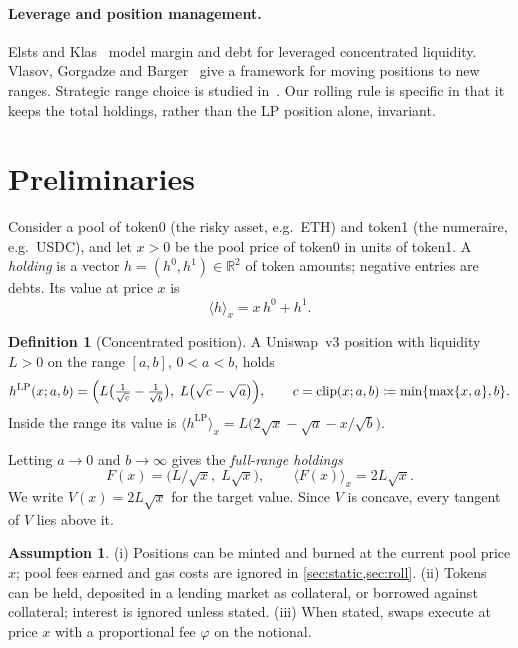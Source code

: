 \documentclass[11pt]{article}
\theoremstyle{definition}
\newtheorem{definition}{Definition}
\newtheorem{assumption}{Assumption}
\theoremstyle{remark}
\newcommand{\clip}{\operatorname{clip}}
\newcommand{\val}[2]{\langle #1\rangle_{#2}}
\newcommand{\hLP}{h^{\mathrm{LP}}}
\begin{document}
\paragraph{Leverage and position management.}
Elsts and Klas~\cite{elsts2024leverage} model margin and debt for leveraged concentrated liquidity. Vlasov, Gorgadze and Barger~\cite{vlasov2025framework} give a framework for moving positions to new ranges. Strategic range choice is studied in~\cite{neuder2021strategic,fan2022differential}. Our rolling rule is specific in that it keeps the total holdings, rather than the LP position alone, invariant.

\section{Preliminaries}\label{sec:prelim}

Consider a pool of token0 (the risky asset, e.g.\ ETH) and token1 (the numeraire, e.g.\ USDC), and let $x>0$ be the pool price of token0 in units of token1. A \emph{holding} is a vector $h=(h^0,h^1)\in\mathbb{R}^2$ of token amounts; negative entries are debts. Its value at price $x$ is
\[
  \val{h}{x} = x\,h^0 + h^1 .
\]

\begin{definition}[Concentrated position]
A Uniswap~v3 position with liquidity $L>0$ on the range $[a,b]$, $0<a<b$, holds~\cite{adams2021uniswap}
\begin{equation}\label{eq:lp}
  \hLP(x;a,b) = \Bigl(L\bigl(\tfrac{1}{\sqrt{c}}-\tfrac{1}{\sqrt{b}}\bigr),\; L\bigl(\sqrt{c}-\sqrt{a}\bigr)\Bigr),
  \qquad c=\clip(x;a,b)\coloneqq\min\{\max\{x,a\},b\}.
\end{equation}
Inside the range its value is $\val{\hLP}{x}=L\bigl(2\sqrt{x}-\sqrt{a}-x/\sqrt{b}\bigr)$.
\end{definition}

Letting $a\to 0$ and $b\to\infty$ gives the \emph{full-range holdings}
\begin{equation}\label{eq:full}
  F(x) = \bigl(L/\sqrt{x},\; L\sqrt{x}\bigr),\qquad \val{F(x)}{x} = 2L\sqrt{x}.
\end{equation}
We write $V(x)=2L\sqrt{x}$ for the target value. Since $V$ is concave, every tangent of $V$ lies above it.

\begin{assumption}\label{ass:frictionless}
(i) Positions can be minted and burned at the current pool price $x$; pool fees earned and gas costs are ignored in \cref{sec:static,sec:roll}. (ii) Tokens can be held, deposited in a lending market as collateral, or borrowed against collateral; interest is ignored unless stated. (iii) When stated, swaps execute at price $x$ with a proportional fee $\varphi$ on the notional.
\end{assumption}
\end{document}
